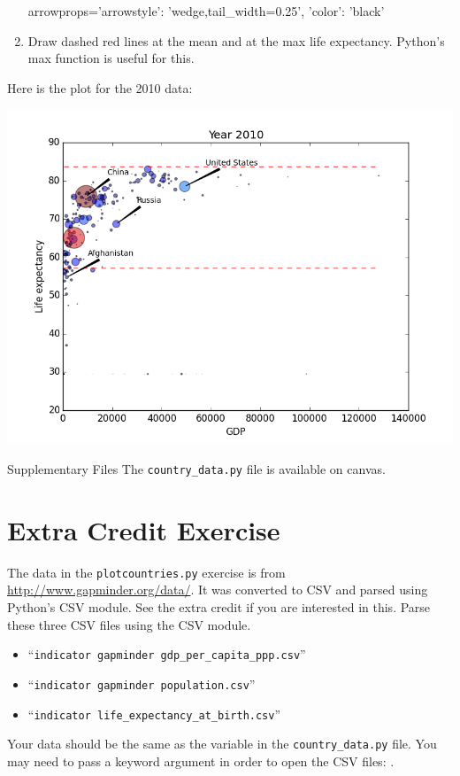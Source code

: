 \documentclass[11pt]{cselabheader}
\begin{document}
\begin{ex}[plotcountries.py]
\begin{enumerate}
\begin{python3code}
arrowprops={'arrowstyle': 'wedge,tail_width=0.25', 'color': 'black'}
\end{python3code}

\item Draw dashed red lines at the mean and at the max life expectancy.
Python's max function is useful for this.
\end{enumerate}

Here is the plot for the 2010 data:

\begin{center}
\includegraphics[width=\textwidth]{img/scatter_2010.png}
\end{center}
\end{ex}

\begin{infobox}{Supplementary Files}
The \texttt{country\_data.py} file is available on canvas.
\end{infobox}

\newpage
\section{Extra Credit Exercise}
\begin{extraex}[parsecsv.py]
The data in the \texttt{plotcountries.py} exercise is from
\url{http://www.gapminder.org/data/}. It was converted to CSV and
parsed using Python's CSV module. See the extra credit if you are
interested in this.  Parse these three CSV files using the CSV module.

\begin{itemize}
\item ``\texttt{indicator gapminder gdp\_per\_capita\_ppp.csv}''
\item ``\texttt{indicator gapminder population.csv}''
\item ``\texttt{indicator life\_expectancy\_at\_birth.csv}''
\end{itemize}

Your data should be the same as the  variable in
the \texttt{country\_data.py} file. You may need to pass a keyword
argument in order to open the CSV files: .
\end{extraex}
\end{document}

